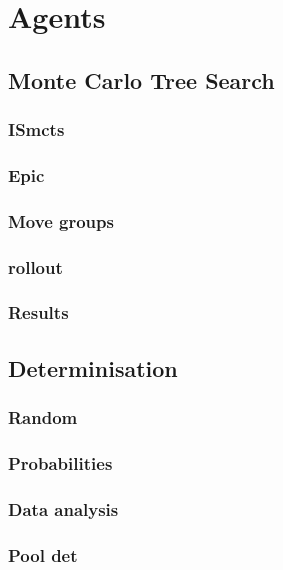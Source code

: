 \section{Agents}


\subsection{Monte Carlo Tree Search}

\subsubsection{ISmcts}


\subsubsection{Epic}


\subsubsection{Move groups}

\subsubsection{rollout}


\subsubsection{Results}


\subsection{Determinisation}


\subsubsection{Random}


\subsubsection{Probabilities}


\subsubsection{Data analysis}


\subsubsection{Pool det}


